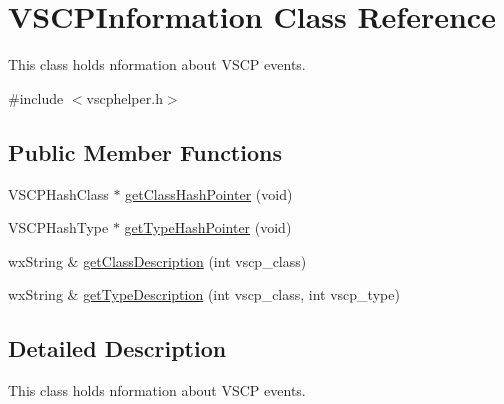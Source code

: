 \hypertarget{class_v_s_c_p_information}{
\section{VSCPInformation Class Reference}
\label{d3/d02/class_v_s_c_p_information}
}


This class holds nformation about VSCP events.  




{\ttfamily \#include $<$vscphelper.h$>$}

\subsection*{Public Member Functions}
\begin{DoxyCompactItemize}
\item 
VSCPHashClass $\ast$ \hyperlink{class_v_s_c_p_information_ad1faebc124a8e232e8bca1e9d3507f47}{getClassHashPointer} (void)
\item 
VSCPHashType $\ast$ \hyperlink{class_v_s_c_p_information_a8245b59fb9dc24a017a72065c3bd7d9d}{getTypeHashPointer} (void)
\item 
wxString \& \hyperlink{class_v_s_c_p_information_a31e8f21b6c948a3d5b24b7caf675596c}{getClassDescription} (int vscp\_\-class)
\item 
wxString \& \hyperlink{class_v_s_c_p_information_a7838fd04f2612070af30ddd0e988d0ee}{getTypeDescription} (int vscp\_\-class, int vscp\_\-type)
\end{DoxyCompactItemize}


\subsection{Detailed Description}
This class holds nformation about VSCP events. 


